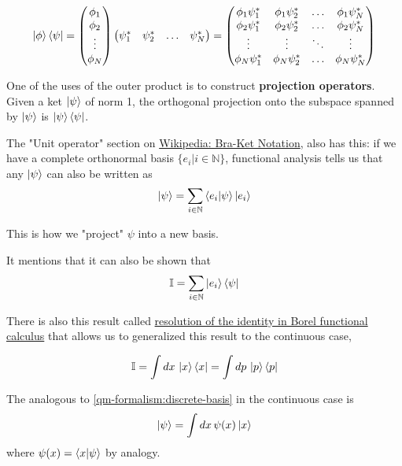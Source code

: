 $$
\ket{\phi}\bra{\psi}
=
\begin{pmatrix}
    \phi_1 \\
    \phi_2 \\
    \vdots \\
    \phi_N 
\end{pmatrix}
\begin{pmatrix}
    \psi_{1}^{*} & \psi_{2}^{*} & \ldots & \psi_{N}^{*}
\end{pmatrix}
=
\begin{pmatrix} 
    \phi_1 \psi_{1}^{*} & \phi_1 \psi_{2}^{*} & \dots  & \phi_1 \psi_{N}^{*} \\
    \phi_2 \psi_{1}^{*} & \phi_2 \psi_{2}^{*} & \dots  & \phi_2 \psi_{N}^{*} \\
    \vdots              & \vdots              & \ddots & \vdots              \\
    \phi_N \psi_{1}^{*} & \phi_N \psi_{2}^{*} & \dots  & \phi_N \psi_{N}^{*} \\
\end{pmatrix}
$$

One of the uses of the outer product is to construct \textbf{projection operators}. Given a ket $\ket{\psi}$
of norm 1, the orthogonal projection onto the subspace spanned by $\ket{\psi}$ is $\ket{\psi}\bra{\psi}$.


The "Unit operator" section on \href{https://en.wikipedia.org/wiki/Bra%E2%80%93ket_notation}{Wikipedia: Bra-Ket Notation},
also has this: if we have a complete orthonormal basis $\{ e_i | i\in\mathbb{N} \}$,
functional analysis tells us that any $\ket{\psi}$ can also be written as
\begin{equation}
\ket{\psi} =
\sum_{i\in\mathbb{N}} \braket{e_i | \psi} \ket{e_i} %
\end{equation}

This is how we "project" $\psi$ into a new basis.

It mentions that it can also be shown that
$$
\mathbb{I} = \sum_{i\in\mathbb{N}} \ket{e_i} \bra{\psi}
$$

There is also this result called
\href{https://en.wikipedia.org/wiki/Borel_functional_calculus#Resolution_of_the_identity}{resolution of the identity in Borel functional calculus}
that allows us to generalized this result to the continuous case,

$$
\mathbb{I} = \int dx \, \ket{x} \bra{x} = \int dp \, \ket{p} \bra{p}
$$


The analogous to \ref{qm-formalism:discrete-basis} in the continuous case is
$$
\ket{\psi} = \int dx\, \psi(x) \ket{x}
$$
where $\psi (x) = \braket{x | \psi}$ by analogy.
\\


